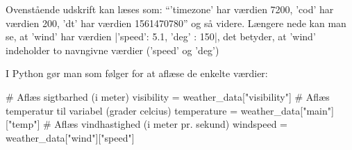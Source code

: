\documentclass{ucph-handout}
\begin{document}




\begin{exercisebox}[adjusted title=Aflæs enkeltværdier]
\vspace{-2mm}
Ovenstående udskrift kan læses som: ``'timezone' har værdien 7200,
'cod' har værdien 200, 'dt' har værdien 1561470780'' og så
videre. Længere nede kan man se, at 'wind' har værdien \ttpy|{'speed':  5.1, 'deg' : 150}|,
det betyder, at 'wind' indeholder to navngivne værdier ('speed' og 'deg')

\vspace{1mm}
\noindent
I Python gør man som følger for at aflæse de enkelte værdier:
\begin{python}
# Aflæs sigtbarhed (i meter)
visibility = weather_data["visibility"]
# Aflæs temperatur til variabel (grader celcius)
temperature = weather_data["main"]["temp"]
# Aflæs vindhastighed (i meter pr. sekund)
windspeed = weather_data["wind"]["speed"]\end{python}
\vspace{-4mm}
\end{exercisebox}
\newpage
\end{document}
